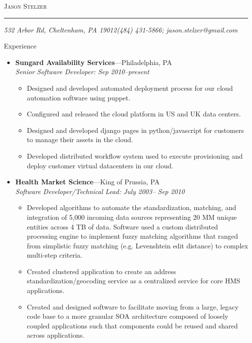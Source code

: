 \documentclass[11pt,oneside]{article}
\makeatletter
\newcommand{\name}{Jason Stelzer}
\newcommand{\addr}{532 Arbor Rd, Cheltenham, PA 19012}
\newcommand{\phone}{(484) 431-5866}
\newcommand{\email}{jason.stelzer@gmail.com}
\newcommand{\bigname}[1]{
	\begin{center}\fontfamily{phv}\selectfont\Huge\scshape#1\end{center}
}
\newenvironment{ressection}[1]{
	\vspace{4pt}
	{\fontfamily{phv}\selectfont\Large#1}
	\begin{itemize}
	\vspace{3pt}
}{
	\end{itemize}
}
\newcommand{\ressubitem}[1]{
	\vspace{-1pt}
	\item \begin{flushleft} #1 \end{flushleft}
}
\newcommand{\resbigitem}[3]{
	\vspace{-5pt}
	\item
	\textbf{#1}---#2 \\
	\textit{#3}
}
\newenvironment{ressubsec}[3]{
	\resbigitem{#1}{#2}{#3}
	\vspace{-2pt}
	\begin{itemize}
}{
	\end{itemize}
}
\makeatother
\begin{document}
 \selectfont

\bigname{\name}

\vspace{-8pt} \rule{\textwidth}{1pt}

\vspace{-1pt} {\small\itshape \addr \hfill \phone; \email}

\vspace{8 pt}

\begin{ressection}{Experience}
  
	\begin{ressubsec}{Sungard Availability Services}{Philadelphia, PA}{Senior Software Developer: Sep 2010--present}

	  \ressubitem{Designed and developed automated deployment process for our cloud automation software using puppet. }
	  \ressubitem{Configured and released the cloud platform in US and UK data centers. }
	  \ressubitem{Designed and developed django pages in python/javascript for customers to manage their assets in the cloud. }
	  \ressubitem{Developed distributed workflow system used to execute provisioning and deploy customer virtual datacenters in our cloud. }
	\end{ressubsec}  

	\begin{ressubsec}{Health Market Science}{King of Prussia, PA}{Software Developer/Technical Lead: July 2003-- Sep 2010}

	  \ressubitem{Developed algorithms to automate the
            standardization, matching, and integration of 5,000
            incoming data sources representing 20 MM unique entities
            across 4 TB of data.  Software used a custom distributed
            processing engine to implement fuzzy matching algorithms
            that ranged from simplistic fuzzy matching
            (e.g. Levenshtein edit distance) to complex multi-step
            criteria. }

	  \ressubitem{Created clustered application to create an
            address standardization/geocoding service as a centralized
            service for core HMS applications.}

	  \ressubitem{Created and designed software to facilitate
            moving from a large, legacy code base to a more granular
            SOA architecture composed of loosely coupled applications
            such that components could be reused and shared across
            applications.}


\end{ressubsec}
\end{ressection}
\end{document}
